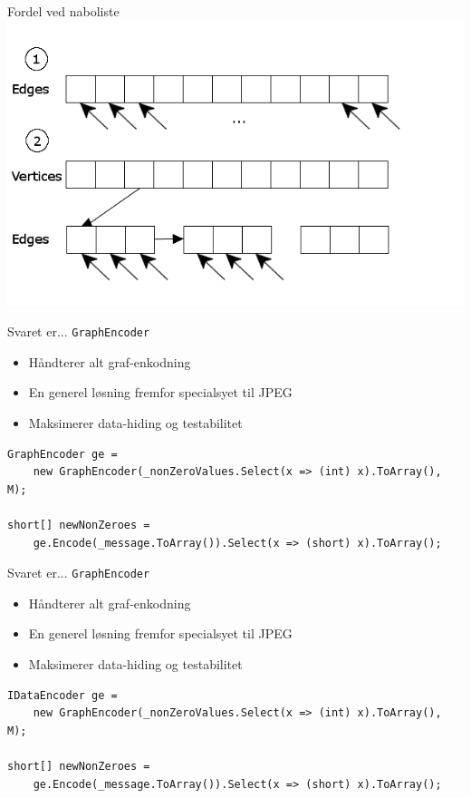 \begin{frame}{Fordel ved naboliste}{}
\includegraphics[width=\textwidth]{figures/graphLists.png}
\end{frame}



\begin{frame}[fragile]{Svaret er...}{}
\lstinline|GraphEncoder|
\begin{itemize}
	\item Håndterer alt graf-enkodning
	\item En generel løsning fremfor specialsyet til JPEG
	\item Maksimerer data-hiding og testabilitet
\end{itemize}

\begin{lstlisting}[breaklines=true,basicstyle=\tiny,frame=single]
GraphEncoder ge = 
    new GraphEncoder(_nonZeroValues.Select(x => (int) x).ToArray(), M);

short[] newNonZeroes = 
    ge.Encode(_message.ToArray()).Select(x => (short) x).ToArray();
\end{lstlisting}
\end{frame}
\begin{frame}[fragile]{Svaret er...}{}
\lstinline|GraphEncoder|
\begin{itemize}
	\item Håndterer alt graf-enkodning
	\item En generel løsning fremfor specialsyet til JPEG
	\item Maksimerer data-hiding og testabilitet
\end{itemize}

\begin{lstlisting}[breaklines=true,basicstyle=\tiny,frame=single]
IDataEncoder ge = 
    new GraphEncoder(_nonZeroValues.Select(x => (int) x).ToArray(), M);

short[] newNonZeroes = 
    ge.Encode(_message.ToArray()).Select(x => (short) x).ToArray();
\end{lstlisting}
\end{frame}